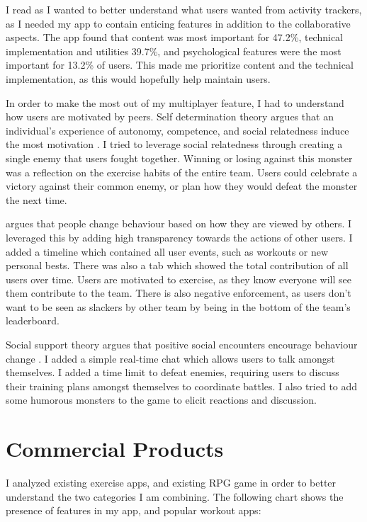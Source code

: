 \documentclass{l4proj}
\begin{document}
I read \citet{User_expectations} as I wanted to better understand what users wanted from activity trackers, as I needed my app to contain enticing features in addition to the collaborative aspects. The app found that content was most important for 47.2\%, technical implementation and utilities 39.7\%, and psychological features were the most important for 13.2\% of users. This made me prioritize content and the technical implementation, as this would hopefully help maintain users.

In order to make the most out of my multiplayer feature, I had to understand how users are motivated by peers. Self determination theory argues that an individual's experience of autonomy, competence, and social relatedness induce the most motivation \citep{self_determination_theory}. I tried to leverage social relatedness through creating a single enemy that users fought together. Winning or losing against this monster was a reflection on the exercise habits of the entire team. Users could celebrate a victory against their common enemy, or plan how they would defeat the monster the next time.

\citet{social_comparison_theory} argues that people change behaviour based on how they are viewed by others. I leveraged this by adding high transparency towards the actions of other users. I added a timeline which contained all user events, such as workouts or new personal bests. There was also a tab which showed the total contribution of all users over time. Users are motivated to exercise, as they know everyone will see them contribute to the team. There is also negative enforcement, as users don't want to be seen as slackers by other team by being in the bottom of the team's leaderboard.

Social support theory argues that positive social encounters encourage behaviour change \citep{social_support_theory}. I added a simple real-time chat which allows users to talk amongst themselves. I added a time limit to defeat enemies, requiring users to discuss their training plans amongst themselves to coordinate battles. I also tried to add some humorous monsters to the game to elicit reactions and discussion. 


\section{Commercial Products}
I analyzed existing exercise apps, and existing RPG game in order to better understand the two categories I am combining. The following chart shows the presence of features in my app, and popular workout apps:
\end{document}
